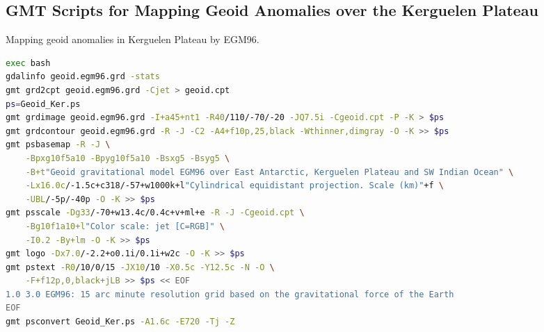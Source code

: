 \documentclass[geomatics,article,accept,pdftex,moreauthors]{Definitions/mdpi}
\begin{document}
\subsection[\appendixname~\thesubsection]{GMT Scripts for Mapping Geoid Anomalies over the Kerguelen Plateau}
\vspace{-9pt}
\begin{listing}[H]
\caption{Mapping geoid anomalies in Kerguelen Plateau by EGM96.}
\label{lst11}
\begin{lstlisting}[xleftmargin=10pt,xrightmargin=3.5pt ,language=bash,caption={}]
exec bash
gdalinfo geoid.egm96.grd -stats
gmt grd2cpt geoid.egm96.grd -Cjet > geoid.cpt
ps=Geoid_Ker.ps
gmt grdimage geoid.egm96.grd -I+a45+nt1 -R40/110/-70/-20 -JQ7.5i -Cgeoid.cpt -P -K > $ps
gmt grdcontour geoid.egm96.grd -R -J -C2 -A4+f10p,25,black -Wthinner,dimgray -O -K >> $ps
gmt psbasemap -R -J \
    -Bpxg10f5a10 -Bpyg10f5a10 -Bsxg5 -Bsyg5 \
    -B+t"Geoid gravitational model EGM96 over East Antarctic, Kerguelen Plateau and SW Indian Ocean" \
    -Lx16.0c/-1.5c+c318/-57+w1000k+l"Cylindrical equidistant projection. Scale (km)"+f \
    -UBL/-5p/-40p -O -K >> $ps
gmt psscale -Dg33/-70+w13.4c/0.4c+v+ml+e -R -J -Cgeoid.cpt \
    -Bg10f1a10+l"Color scale: jet [C=RGB]" \
    -I0.2 -By+lm -O -K >> $ps
gmt logo -Dx7.0/-2.2+o0.1i/0.1i+w2c -O -K >> $ps
gmt pstext -R0/10/0/15 -JX10/10 -X0.5c -Y12.5c -N -O \
    -F+f12p,0,black+jLB >> $ps << EOF
1.0 3.0 EGM96: 15 arc minute resolution grid based on the gravitational force of the Earth
EOF
gmt psconvert Geoid_Ker.ps -A1.6c -E720 -Tj -Z
\end{lstlisting}
\end{listing}
\end{document}
